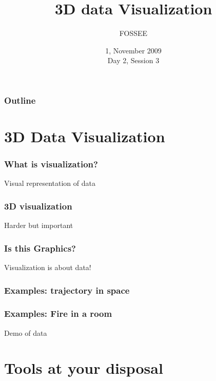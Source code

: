 \documentclass[compress,14pt]{beamer}
\title[]{3D data Visualization}
\author[FOSSEE Team] {FOSSEE}
\institute[IIT Bombay] {Department of Aerospace Engineering\\IIT Bombay}
\date[] {1, November 2009\\Day 2, Session 3}
\newcounter{time}
\newcommand{\inctime}[1]{\addtocounter{time}{#1}{\vspace*{0.1in}\tiny \thetime\ m}}
\begin{document}
\begin{frame}
  \maketitle
\end{frame}

\begin{frame}
  \frametitle{Outline}
  \tableofcontents
\end{frame}

\section{3D Data Visualization}

\begin{frame}
    \frametitle{What is visualization?}
    \Large
    \begin{center}
    Visual representation of data
    \end{center}
\end{frame}

\begin{frame}
    \frametitle{3D visualization}
    \Large
    \begin{center}
        Harder but important
    \end{center}
\end{frame}

\begin{frame}
    \frametitle{Is this Graphics?}
    \Large
    \begin{center}
        Visualization is about data!
    \end{center}
\end{frame}

\begin{frame}
    \frametitle{Examples: trajectory in space}
    \Large
    \begin{center}
    \end{center}
\end{frame}

\begin{frame}
    \frametitle{Examples: Fire in a room}
    \Large
    \begin{center}
        Demo of data
    \end{center}
\inctime{10}
\end{frame}

\section{Tools at your disposal}
\end{document}
